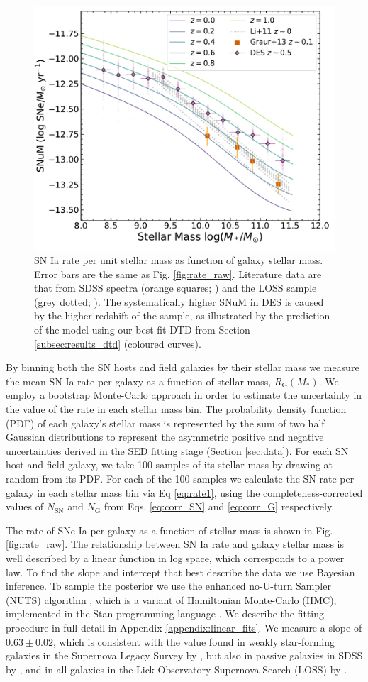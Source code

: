 \documentclass[fleqn,usenatbib]{mnras}
\begin{document}
\begin{figure}
    \centering
    \includegraphics[width=.5\textwidth]{figs/SNuM.pdf}
    \caption{SN Ia rate per unit stellar mass as function of galaxy stellar mass. Error bars are the same as Fig. \ref{fig:rate_raw}. Literature data are that from SDSS spectra (orange squares; \citealt{Graur2013}) and the LOSS sample (grey dotted; \citealt{Li2011a}). The systematically higher SNuM in DES is caused by the higher redshift of the sample, as illustrated by the  prediction of the model using our best fit DTD from Section \ref{subsec:results_dtd} (coloured curves). }%
    \label{fig:snum}
\end{figure}
By binning both the SN hosts and field galaxies by their stellar mass we measure the mean SN Ia rate per galaxy as a function of stellar mass, $R_{\mathrm{G}}(M_*)$. We employ a bootstrap Monte-Carlo approach in order to estimate the uncertainty in the value of the rate in each stellar mass bin. The probability density function (PDF) of each galaxy's stellar mass is represented by the sum of two half Gaussian distributions to represent the asymmetric positive and negative uncertainties derived in the SED fitting stage (Section \ref{sec:data}). For each SN host and field galaxy, we take 100 samples of its stellar mass by drawing at random from its PDF. For each of the 100 samples we calculate the SN rate per galaxy in each stellar mass bin via Eq \ref{eq:rate1}, using the completeness-corrected values of $N_{\mathrm{SN}}$ and $N_{\mathrm{G}}$ from Eqs. \ref{eq:corr_SN} and \ref{eq:corr_G} respectively. 

The rate of SNe Ia per galaxy as a function of stellar mass is shown in Fig. \ref{fig:rate_raw}. The relationship between SN Ia rate and galaxy stellar mass is well described by a linear function in log space, which corresponds to a power law. To find the slope and intercept that best describe the data we use Bayesian inference. To sample the posterior we use the enhanced no-U-turn Sampler (NUTS) algorithm \citep{Betancourt2017}, which is a variant of Hamiltonian Monte-Carlo (HMC), implemented in the Stan programming language \citep{Carpenter2017}. We describe the fitting procedure in full detail in Appendix \ref{appendix:linear_fits}. We measure a slope of $0.63\pm0.02$, which is consistent with the value found in weakly star-forming galaxies in the Supernova Legacy Survey by \citet{Sullivan2006}, but also in passive galaxies in SDSS by \citet{Smith2012}, and in all galaxies in the Lick Observatory Supernova Search (LOSS) by \citet{Li2011a}. 
\end{document}
